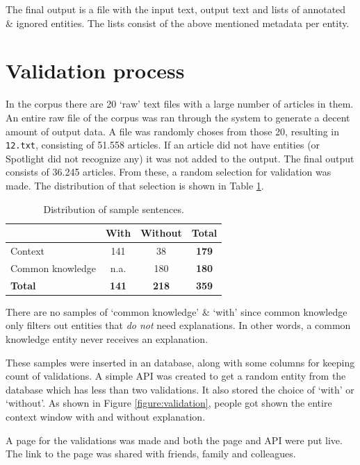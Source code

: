 \documentclass[
10pt, %
a4paper, %
oneside, %
headinclude,footinclude, %
] {book}%
\begin{document}
The final output is a file with the input text, output text and lists of annotated \& ignored entities.
The lists consist of the above mentioned metadata per entity.

\section{Validation process}
In the corpus there are 20 `raw' text files with a large number of articles in them.
An entire raw file of the corpus was ran through the system to generate a decent amount of output data.
A file was randomly choses from those 20, resulting in \verb+12.txt+, consisting of 51.558 articles.
If an article did not have entities (or Spotlight did not recognize any) it was not added to the output.
The final output consists of 36.245 articles.
From these, a random selection for validation was made.
The distribution of that selection is shown in Table \ref{table:sample}.

\begin{table}[hbtp]\centering
  \caption{Distribution of sample sentences.\label{table:sample}}
  \begin{tabular}{l|ccc}
                     & With         & Without      & \textbf{Total} \\
    \hline
    Context          & 141          & 38           & \textbf{179}   \\
    Common knowledge & n.a.         & 180          & \textbf{180}   \\
    \textbf{Total}   & \textbf{141} & \textbf{218} & \textbf{359}   \\
  \end{tabular}
\end{table}

There are no samples of `common knowledge' \& `with' since common knowledge only filters out entities that \textit{do not} need explanations.
In other words, a common knowledge entity never receives an explanation.

These samples were inserted in an database, along with some columns for keeping count of validations.
A simple API was created to get a random entity from the database which has less than two validations.
It also stored the choice of `with' or `without'.
As shown in Figure \ref{figure:validation}, people got shown the entire context window with and without explanation.

A page for the validations was made and both the page and API were put live.
The link to the page was shared with friends, family and colleagues.
\end{document}
